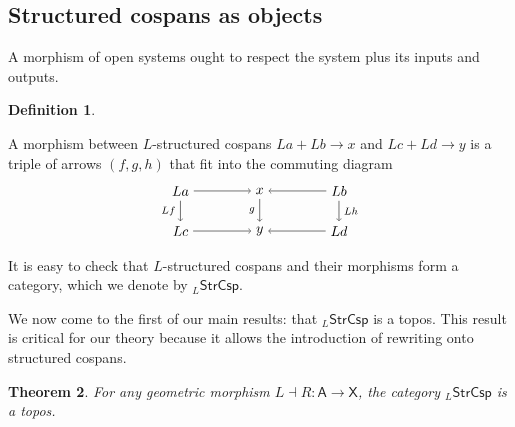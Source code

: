 \documentclass{amsart}
\newcommand{\A}{\cat{A}}
\newcommand{\X}{\cat{X}}
\newcommand{\StrCsp}{\cat{StrCsp}}
\newcommand{\cat}[1]{\mathsf{#1}}
\newcommand{\from}{\colon}
\newcommand{\csp}[3]{#1 + #3 \to #2}
\newtheorem{theorem}{Theorem}[section]
\theoremstyle{remark}
\theoremstyle{definition}
\newtheorem{definition}[theorem]{Definition}
\begin{document}

\subsection{Structured cospans as objects}
\label{sec:StrCspAsObject}

A morphism of open systems ought to respect the system plus
its inputs and outputs.

\begin{definition} \label{df:morph-of-strcsp}

  A morphism between $ L $-structured cospans
  \( \csp{La}{x}{Lb} \) and \( \csp{Lc}{y}{Ld} \) is a
  triple of arrows $ ( f,g,h ) $ that fit into the commuting
  diagram
  \[
    \begin{tikzpicture}
      \node (1) at (-2,1) {\( La \)};
      \node (2) at (0,1) {\( x \)};
      \node (3) at (2,1) {\( Lb \)};
      \node (4) at (-2,0) {\( Lc \)};
      \node (5) at (0,0) {\( y \)};
      \node (6) at (2,0) {\( Ld \)};
      \draw [->] (1) to node [above] {\scriptsize{\(  \)}} (2);
      \draw [->] (3) to node [above] {\scriptsize{\(  \)}} (2);
      \draw [->] (4) to node [below] {\scriptsize{\(  \)}} (5);
      \draw [->] (6) to node [below] {\scriptsize{\(  \)}} (5);
      \draw [->] (1) to node [left] {\scriptsize{\( Lf \)}} (4);
      \draw [->] (2) to node [left] {\scriptsize{\( g \)}} (5);
      \draw [->] (3) to node [right] {\scriptsize{\( Lh \)}} (6);
    \end{tikzpicture}
  \]
\end{definition}

It is easy to check that $ L $-structured cospans and their
morphisms form a category, which we denote by
$ _{L}\StrCsp $.

We now come to the first of our main results: that
$ _{L}\StrCsp $ is a topos. This result is critical for our
theory because it allows the introduction of rewriting onto
structured cospans.

\begin{theorem}
\label{thm:strcsp-istopos}
For any geometric morphism $ L \dashv R \from \A \to \X $,
the category $ _{L}\StrCsp $ is a topos.
\end{theorem}
\end{document}
